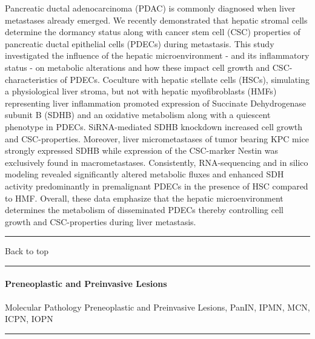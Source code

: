 \documentclass[]{article}
\let\oldparagraph\paragraph
\renewcommand{\paragraph}[1]{\oldparagraph{#1}\mbox{}}
\begin{document}
Pancreatic ductal adenocarcinoma (PDAC) is commonly diagnosed when liver
metastases already emerged. We recently demonstrated that hepatic
stromal cells determine the dormancy status along with cancer stem cell
(CSC) properties of pancreatic ductal epithelial cells (PDECs) during
metastasis. This study investigated the influence of the hepatic
microenvironment - and its inflammatory status - on metabolic
alterations and how these impact cell growth and CSC-characteristics of
PDECs. Coculture with hepatic stellate cells (HSCs), simulating a
physiological liver stroma, but not with hepatic myofibroblasts (HMFs)
representing liver inflammation promoted expression of Succinate
Dehydrogenase subunit B (SDHB) and an oxidative metabolism along with a
quiescent phenotype in PDECs. SiRNA-mediated SDHB knockdown increased
cell growth and CSC-properties. Moreover, liver micrometastases of tumor
bearing KPC mice strongly expressed SDHB while expression of the
CSC-marker Nestin was exclusively found in macrometastases.
Consistently, RNA-sequencing and in silico modeling revealed
significantly altered metabolic fluxes and enhanced SDH activity
predominantly in premalignant PDECs in the presence of HSC compared to
HMF. Overall, these data emphasize that the hepatic microenvironment
determines the metabolism of disseminated PDECs thereby controlling cell
growth and CSC-properties during liver metastasis.

{}

{}

\begin{center}\rule{0.5\linewidth}{\linethickness}\end{center}

Back to top

\begin{center}\rule{0.5\linewidth}{\linethickness}\end{center}

\pagebreak

\hypertarget{preneoplastic-and-preinvasive-lesions-1}{%
\paragraph{Preneoplastic and Preinvasive
Lesions}\label{preneoplastic-and-preinvasive-lesions-1}}

Molecular Pathology Preneoplastic and Preinvasive Lesions, PanIN, IPMN,
MCN, ICPN, IOPN

\begin{center}\rule{0.5\linewidth}{\linethickness}\end{center}
\end{document}
